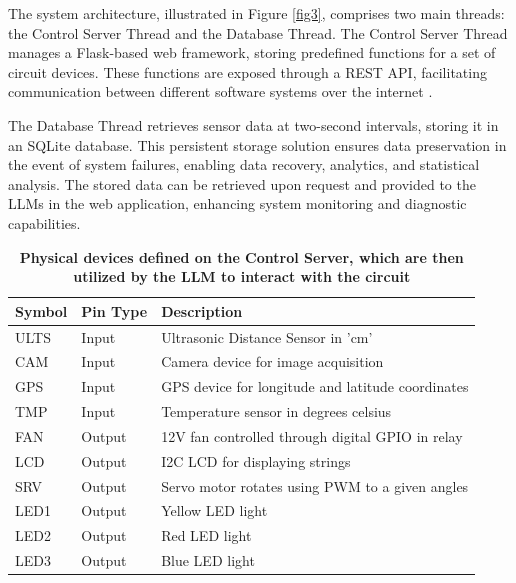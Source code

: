 \documentclass{ieeeaccess}
\begin{document}
The system architecture, illustrated in Figure  \ref{fig3}, comprises two main threads: the Control Server Thread and the Database Thread. The Control Server Thread manages a Flask-based web framework, storing predefined functions for a set of circuit devices. These functions are exposed through a REST API, facilitating communication between different software systems over the internet \cite{Surwase2016RESTAM}.

The Database Thread retrieves sensor data at two-second intervals, storing it in an SQLite database. This persistent storage solution ensures data preservation in the event of system failures, enabling data recovery, analytics, and statistical analysis. The stored data can be retrieved upon request and provided to the LLMs in the web application, enhancing system monitoring and diagnostic capabilities.

\begin{table}
    \caption{\textbf{Physical devices defined on the Control Server, which are then utilized by the LLM to interact with the circuit}}
    \label{table1}
    \setlength{\tabcolsep}{3pt}
    \begin{tabular}{|p{30pt}|p{32pt}|p{165pt}|}
        \hline
        \textbf{Symbol} &
        \textbf{Pin Type}   &
        \textbf{Description}                                             \\
        \hline
        ULTS   &
        Input  &
        Ultrasonic Distance Sensor in 'cm'                      \\
        \hline
        CAM    &
        Input  &
        Camera device for image acquisition                       \\
        \hline
        GPS    &
        Input  &
        GPS device for longitude and latitude coordinates       \\
        \hline
        TMP    &
        Input  &
        Temperature sensor in degrees celsius    \\
        \hline
        FAN    &
        Output &
        12V fan controlled through digital GPIO in relay \\
        \hline
        LCD    &
        Output &
        I2C LCD for displaying strings                          \\
        \hline
        SRV    &
        Output &
        Servo motor rotates using PWM to a given angles         \\
        \hline
        LED1   &
        Output &
        Yellow LED light                                        \\
        \hline
        LED2   &
        Output &
        Red LED light                                           \\
        \hline
        LED3   &
        Output &
        Blue LED light                                          \\
        \hline
    \end{tabular}
\end{table}
\end{document}
